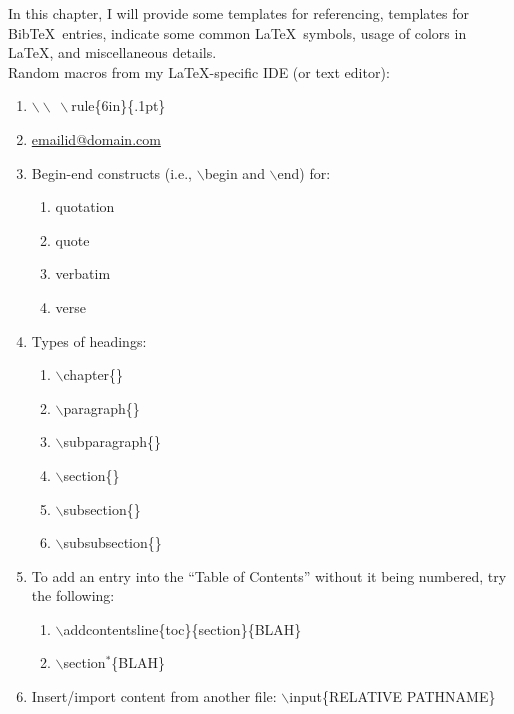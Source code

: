 In this chapter, I will provide some templates for referencing, templates for {\sc Bib}\TeX\ entries, indicate some common \LaTeX\ symbols, usage of colors in \LaTeX, and miscellaneous details. \\


Random macros from my \LaTeX-specific IDE (or text editor): \vspace{-0.3cm}
\begin{enumerate} \itemsep -4pt
\item $\backslash\backslash\ \backslash$rule\{6in\}\{.1pt\}			%
\item \href{mailto:emailid@domain.com}{emailid@domain.com}		%
\item Begin-end constructs (i.e., $\backslash$begin and $\backslash$end) for: \vspace{-0.3cm}
	\begin{enumerate} \itemsep -2pt
	\item quotation
	\item quote
	\item verbatim
	\item verse
	\end{enumerate}
\item Types of headings: \vspace{-0.3cm}
	\begin{enumerate} \itemsep -2pt
	\item $\backslash$chapter\{\}
	\item $\backslash$paragraph\{\}
	\item $\backslash$subparagraph\{\}
	\item $\backslash$section\{\}
	\item $\backslash$subsection\{\}
	\item $\backslash$subsubsection\{\}
	\end{enumerate}
\item To add an entry into the ``Table of Contents'' without it being numbered, try the following: \vspace{-0.3cm}
	\begin{enumerate} \itemsep -2pt
	\item $\backslash$addcontentsline\{toc\}\{section\}\{BLAH\}
	\item $\backslash$section$^{\ast}$\{BLAH\}
	\end{enumerate}
\item Insert/import content from another file: $\backslash$input\{RELATIVE PATHNAME\}

\end{enumerate}
